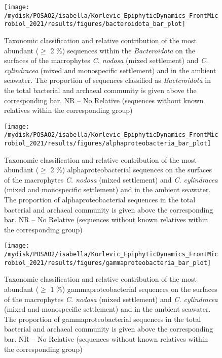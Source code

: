 \documentclass[
  12pt,
]{article}
\begin{document}
\begin{figure}[H]

{\centering \texttt{[image: /mydisk/POSAO2/isabella/Korlevic\_EpiphyticDynamics\_FrontMicrobiol\_2021/results/figures/bacteroidota\_bar\_plot]} 

}

\caption{Taxonomic classification and relative contribution of the most abundant ($\geq$ 2 \si{\percent}) sequences within the \textit{Bacteroidota} on the surfaces of the macrophytes \textit{C. nodosa} (mixed settlement) and \textit{C. cylindracea} (mixed and monospecific settlement) and in the ambient seawater. The proportion of sequences classified as \textit{Bacteroidota} in the total bacterial and archaeal community is given above the corresponding bar. NR -- No Relative (sequences without known relatives within the corresponding group)\label{bactero}}\label{fig:unnamed-chunk-6}
\end{figure}

\begin{figure}[H]

{\centering \texttt{[image: /mydisk/POSAO2/isabella/Korlevic\_EpiphyticDynamics\_FrontMicrobiol\_2021/results/figures/alphaproteobacteria\_bar\_plot]} 

}

\caption{Taxonomic classification and relative contribution of the most abundant ($\geq$ 2 \si{\percent}) alphaproteobacterial sequences on the surfaces of the macrophytes \textit{C. nodosa} (mixed settlement) and \textit{C. cylindracea} (mixed and monospecific settlement) and in the ambient seawater. The proportion of alphaproteobacterial sequences in the total bacterial and archaeal community is given above the corresponding bar. NR -- No Relative (sequences without known relatives within the corresponding group)\label{alpha}}\label{fig:unnamed-chunk-7}
\end{figure}

\begin{figure}[H]

{\centering \texttt{[image: /mydisk/POSAO2/isabella/Korlevic\_EpiphyticDynamics\_FrontMicrobiol\_2021/results/figures/gammaproteobacteria\_bar\_plot]} 

}

\caption{Taxonomic classification and relative contribution of the most abundant ($\geq$ 1 \si{\percent}) gammaproteobacterial sequences on the surfaces of the macrophytes \textit{C. nodosa} (mixed settlement) and \textit{C. cylindracea} (mixed and monospecific settlement) and in the ambient seawater. The proportion of gammaproteobacterial sequences in the total bacterial and archaeal community is given above the corresponding bar. NR -- No Relative (sequences without known relatives within the corresponding group)\label{gamma}}\label{fig:unnamed-chunk-8}
\end{figure}
\end{document}
